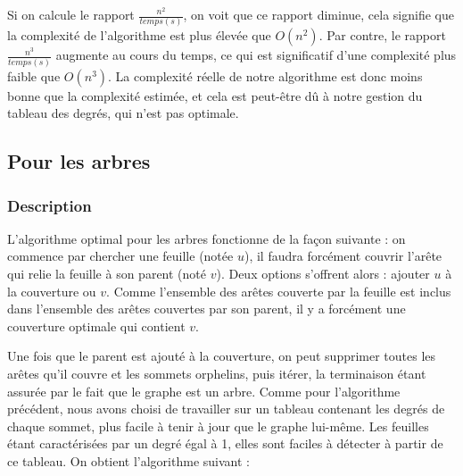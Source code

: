 \documentclass[a4paper,10pt]{article}
\begin{document}
\bigskip
Si on calcule le rapport $\frac{n^2}{temps(s)}$, on voit que ce rapport diminue, cela signifie que la complexité de l'algorithme est plus élevée que $O(n^2)$. Par contre, le rapport $\frac{n^3}{temps(s)}$ augmente au cours du temps, ce qui est significatif d'une complexité plus faible que $O(n^3)$. La complexité réelle de notre algorithme est donc moins bonne que la complexité estimée, et cela est peut-être dû à notre gestion du tableau des degrés, qui n'est pas optimale.

\subsection{Pour les arbres}

\subsubsection{Description}

L'algorithme optimal pour les arbres fonctionne de la façon suivante : on commence par chercher une feuille (notée $u$), il faudra forcément couvrir l'arête qui relie la feuille à son parent (noté $v$). Deux options s'offrent alors : ajouter $u$ à la couverture ou $v$. Comme l'ensemble des arêtes couverte par la feuille est inclus dans l'ensemble des arêtes couvertes par son parent, il y a forcément une couverture optimale qui contient $v$. 

Une fois que le parent est ajouté à la couverture, on peut supprimer toutes les arêtes qu'il couvre et les sommets orphelins, puis itérer, la terminaison étant assurée par le fait que le graphe est un arbre. Comme pour l'algorithme précédent, nous avons choisi de travailler sur un tableau contenant les degrés de chaque sommet, plus facile à tenir à jour que le graphe lui-même. Les feuilles étant caractérisées par un degré égal à 1, elles sont faciles à détecter à partir de ce tableau. On obtient l'algorithme suivant :
\end{document}
